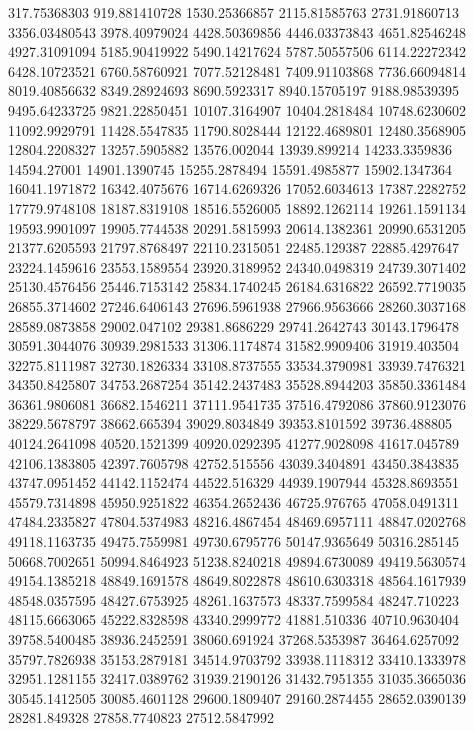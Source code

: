\documentclass[draft=on]{scrbook}
\begin{document}
\begin{minipage}{.5\textwidth}
317.75368303
919.881410728
1530.25366857
2115.81585763
2731.91860713
3356.03480543
3978.40979024
4428.50369856
4446.03373843
4651.82546248
4927.31091094
5185.90419922
5490.14217624
5787.50557506
6114.22272342
6428.10723521
6760.58760921
7077.52128481
7409.91103868
7736.66094814
8019.40856632
8349.28924693
8690.5923317
8940.15705197
9188.98539395
9495.64233725
9821.22850451
10107.3164907
10404.2818484
10748.6230602
11092.9929791
11428.5547835
11790.8028444
12122.4689801
12480.3568905
12804.2208327
13257.5905882
13576.002044
13939.899214
14233.3359836
14594.27001
14901.1390745
15255.2878494
15591.4985877
15902.1347364
16041.1971872
16342.4075676
16714.6269326
17052.6034613
17387.2282752
17779.9748108
18187.8319108
18516.5526005
18892.1262114
19261.1591134
19593.9901097
19905.7744538
20291.5815993
20614.1382361
20990.6531205
21377.6205593
21797.8768497
22110.2315051
22485.129387
22885.4297647
23224.1459616
23553.1589554
23920.3189952
24340.0498319
24739.3071402
25130.4576456
25446.7153142
25834.1740245
26184.6316822
26592.7719035
26855.3714602
27246.6406143
27696.5961938
27966.9563666
28260.3037168
28589.0873858
29002.047102
29381.8686229
29741.2642743
30143.1796478
30591.3044076
30939.2981533
31306.1174874
31582.9909406
31919.403504
32275.8111987
32730.1826334
33108.8737555
33534.3790981
33939.7476321
34350.8425807
34753.2687254
35142.2437483
35528.8944203
35850.3361484
36361.9806081
36682.1546211
37111.9541735
37516.4792086
37860.9123076
38229.5678797
38662.665394
39029.8034849
39353.8101592
39736.488805
40124.2641098
40520.1521399
40920.0292395
41277.9028098
41617.045789
42106.1383805
42397.7605798
42752.515556
43039.3404891
43450.3843835
43747.0951452
44142.1152474
44522.516329
44939.1907944
45328.8693551
45579.7314898
45950.9251822
46354.2652436
46725.976765
47058.0491311
47484.2335827
47804.5374983
48216.4867454
48469.6957111
48847.0202768
49118.1163735
49475.7559981
49730.6795776
50147.9365649
50316.285145
50668.7002651
50994.8464923
51238.8240218
49894.6730089
49419.5630574
49154.1385218
48849.1691578
48649.8022878
48610.6303318
48564.1617939
48548.0357595
48427.6753925
48261.1637573
48337.7599584
48247.710223
48115.6663065
45222.8328598
43340.2999772
41881.510336
40710.9630404
39758.5400485
38936.2452591
38060.691924
37268.5353987
36464.6257092
35797.7826938
35153.2879181
34514.9703792
33938.1118312
33410.1333978
32951.1281155
32417.0389762
31939.2190126
31432.7951355
31035.3665036
30545.1412505
30085.4601128
29600.1809407
29160.2874455
28652.0390139
28281.849328
27858.7740823
27512.5847992

\end{minipage}
\end{document}
